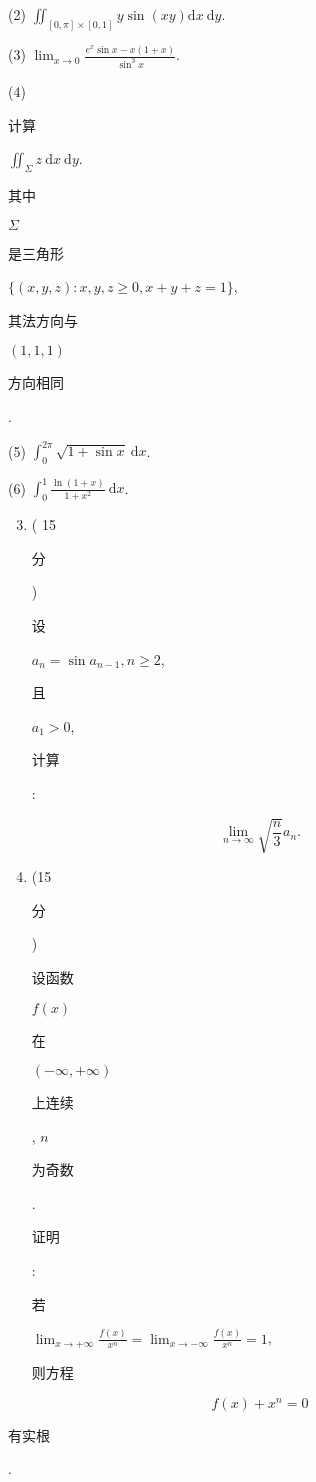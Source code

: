 \documentclass[10pt]{article}
\begin{document}
(2) $\iint_{[0, \pi] \times[0,1]} y \sin (x y) \mathrm{d} x \mathrm{~d} y$.

(3) $\lim _{x \rightarrow 0} \frac{e^{x} \sin x-x(1+x)}{\sin ^{3} x}$.

(4) \begin{CJK}{UTF8}{mj}计算\end{CJK} $\iint_{\Sigma} z \mathrm{~d} x \mathrm{~d} y$. \begin{CJK}{UTF8}{mj}其中\end{CJK} $\Sigma$ \begin{CJK}{UTF8}{mj}是三角形\end{CJK} $\{(x, y, z): x, y, z \geqslant 0, x+y+z=1\}$, \begin{CJK}{UTF8}{mj}其法方向与\end{CJK} $(1,1,1)$ \begin{CJK}{UTF8}{mj}方向相同\end{CJK}.

(5) $\int_{0}^{2 \pi} \sqrt{1+\sin x} \mathrm{~d} x$.

(6) $\int_{0}^{1} \frac{\ln (1+x)}{1+x^{2}} \mathrm{~d} x$.

\begin{enumerate}
  \setcounter{enumi}{2}
  \item ( 15 \begin{CJK}{UTF8}{mj}分\end{CJK}) \begin{CJK}{UTF8}{mj}设\end{CJK} $a_{n}=\sin a_{n-1}, n \geqslant 2$, \begin{CJK}{UTF8}{mj}且\end{CJK} $a_{1}>0$, \begin{CJK}{UTF8}{mj}计算\end{CJK}:
\end{enumerate}
$$
\lim _{n \rightarrow \infty} \sqrt{\frac{n}{3}} a_{n} .
$$

\begin{enumerate}
  \setcounter{enumi}{3}
  \item (15 \begin{CJK}{UTF8}{mj}分\end{CJK}) \begin{CJK}{UTF8}{mj}设函数\end{CJK} $f(x)$ \begin{CJK}{UTF8}{mj}在\end{CJK} $(-\infty,+\infty)$ \begin{CJK}{UTF8}{mj}上连续\end{CJK}, $n$ \begin{CJK}{UTF8}{mj}为奇数\end{CJK}. \begin{CJK}{UTF8}{mj}证明\end{CJK}: \begin{CJK}{UTF8}{mj}若\end{CJK} $\lim _{x \rightarrow+\infty} \frac{f(x)}{x^{n}}=\lim _{x \rightarrow-\infty} \frac{f(x)}{x^{n}}=1$, \begin{CJK}{UTF8}{mj}则方程\end{CJK}
\end{enumerate}
$$
f(x)+x^{n}=0
$$
\begin{CJK}{UTF8}{mj}有实根\end{CJK}.
\end{document}
